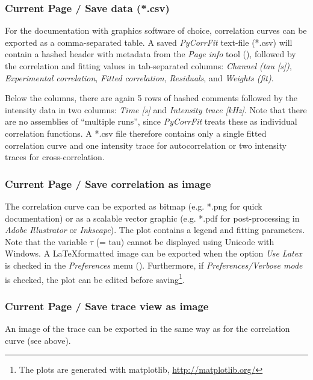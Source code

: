 \subsubsection{Current Page / Save data (*.csv)}
\label{sec:menub.curre.saved}
For the documentation with graphics software of choice, correlation curves can be exported as a comma-separated table. A saved \textit{PyCorrFit} text-file (*.csv) will contain a hashed header with metadata from the \textit{Page info} tool (), followed by the correlation and fitting values in tab-separated columns: \textit{Channel (tau [s])}, \textit{Experimental correlation}, \textit{Fitted correlation}, \textit{Residuals}, and \textit{Weights (fit)}. 

Below the columns, there are again 5 rows of hashed comments followed by the intensity data in two columns: \textit{Time [s]} and \textit{Intensity trace [kHz]}. Note that there are no assemblies of ``multiple runs'', since \textit{PyCorrFit} treats these as individual correlation functions. A *.csv file therefore contains only a single fitted correlation curve and one intensity trace for autocorrelation or two intensity traces for cross-correlation.

\subsubsection{Current Page / Save correlation as image}
\label{sec:menub.curre.savec}
The correlation curve can be exported as bitmap (e.g. *.png for quick documentation) or as a scalable vector graphic (e.g. *.pdf for post-processing in \textit{Adobe Illustrator} or \textit{Inkscape}). The plot contains a legend and fitting parameters. Note that the variable $\tau$ (= tau) cannot be displayed using Unicode with Windows. A \LaTeX formatted image can be exported when the option \textit{Use Latex} is checked in the \textit{Preferences} menu (). Furthermore, if \textit{Preferences/Verbose mode} is checked, the plot can be edited before saving\footnote{The plots are generated with matplotlib, \url{http://matplotlib.org/}}. 

\subsubsection{Current Page / Save trace view as image}
\label{sec:menub.curre.savet}
An image of the trace can be exported in the same way as for the correlation curve (see above). 

